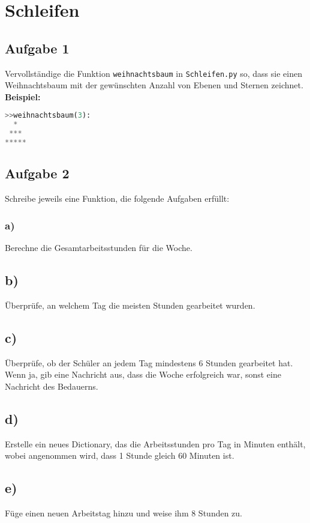 \documentclass{article}
\begin{document}
 \section{Schleifen}
\subsection*{Aufgabe 1}
Vervollständige die Funktion \texttt{weihnachtsbaum} in \texttt{Schleifen.py} so, dass sie einen Weihnachtsbaum mit der gewünschten Anzahl von Ebenen und Sternen zeichnet.\\
\textbf{Beispiel:}
\begin{lstlisting}[language=Python]
>>weihnachtsbaum(3):
  *
 ***
*****
\end{lstlisting}

\subsection*{Aufgabe 2}
Schreibe jeweils eine Funktion, die folgende Aufgaben erfüllt:
\subsubsection*{a)}
Berechne die Gesamtarbeitsstunden für die Woche.
\subsection*{b)}
Überprüfe, an welchem Tag die meisten Stunden gearbeitet wurden.
\subsection*{c)}
Überprüfe, ob der Schüler an jedem Tag mindestens 6 Stunden gearbeitet hat. Wenn ja, gib eine Nachricht aus, dass die Woche erfolgreich war, sonst eine Nachricht des Bedauerns.
\subsection*{d)}
Erstelle ein neues Dictionary, das die Arbeitsstunden pro Tag in Minuten enthält, wobei angenommen wird, dass 1 Stunde gleich 60 Minuten ist.
\subsection*{e)}
Füge einen neuen Arbeitstag hinzu und weise ihm 8 Stunden zu.
\end{document}
